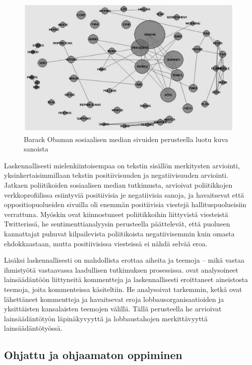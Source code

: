 \documentclass[finnish,gradu,twoside,12pt]{tktltiki}
\begin{document}
{\begin{figure}
\includegraphics[scale=1]{images/word_net.png} 
\caption{Barack Obaman sosiaalisen median sivuiden perusteella luotu kuva sanoista \citep{groshek2013public}}
\label{fig:wordnet}
\end{figure}

Laskennallisesti mielenkiintoisempaa on tekstin sisällön merkitysten arviointi, yksinkertaisimmillaan tekstin positiivisuuden ja negatiivisuuden arviointi. Jatkaen poliitikoiden sosiaalisen median tutkimusta, \citet{park2011networked} arvioivat poliitikkojen verkkoprofiilissa esiintyviä positiivisia je negatiivisia sanoja, ja havaitsevat että oppositiopuolueiden sivuilla oli enemmän positiivisia viestejä hallituspuolueisiin verrattuna. Myöskin \citet{tumasjan2010election} ovat kiinnostuneet poliitikkoihin liittyvistä viesteistä Twitterissä, he sentimenttianalyysin perusteella päättelevät, että puolueen kannattajat puhuvat kilpailevista poliitikoista negatiivisemmin kuin omasta ehdokkaastaan, mutta positiivisissa viesteissä ei nähdä selvää eroa.

Lisäksi laskennallisesti on mahdollista erottaa aiheita ja teemoja -- mikä vastaa ihmistyötä vastaavassa laadullisen tutkimuksen prosessissa. \citet{levy2013driving} ovat analysoineet lainsäädäntöön liittyneitä kommentteja ja laskennallisesti eroittaneet aineistosta teemoja, joita kommenteissa käsiteltiin. He analysoivat tarkemmin, ketkä ovat lähettäneet kommentteja ja havaitsevat eroja lobbausorganisaatioiden ja yksittäisten kansalaisten teemojen välillä. Tällä perusteella he arvioivat lainsäädäntötyön läpinäkyvyyttä ja lobbaustahojen merkittävyyttä lainsäädäntötyössä.

\subsection*{Ohjattu ja ohjaamaton oppiminen}

}
\end{document}
